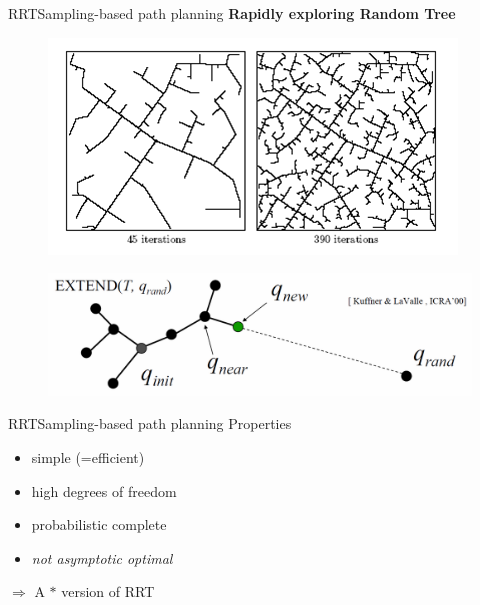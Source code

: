 \begin{frame}{RRT}{Sampling-based path planning}
{\bf Rapidly exploring Random Tree}
	\begin{figure}
		\centering
		\includegraphics[width=.5\linewidth]{figure/RRT_graph1}
		\label{fig:rrt}
	\end{figure}
	\begin{figure}
		\centering
		\includegraphics[width=.9\linewidth]{figure/rrt_extend}
		\label{fig:rrt_extend}
	\end{figure}
\end{frame}

\begin{frame}{RRT}{Sampling-based path planning}
    Properties
	\begin{itemize}
	    \item simple (=efficient)
	    \item high degrees of freedom
		\item probabilistic complete 
		\item \emph{not asymptotic optimal}
	\end{itemize}
	$ \Longrightarrow $
	A $ * $ version of RRT
\end{frame}


